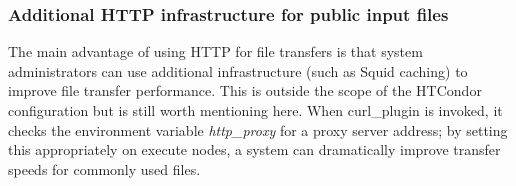 \subsubsection{\label{sec:HTTP-Public-Files-Infrastructure}Additional
HTTP infrastructure for public input files}

The main advantage of using HTTP for file transfers is that system
administrators can use additional infrastructure (such as Squid caching) to
improve file transfer performance. This is outside the scope of the HTCondor 
configuration but is still worth mentioning here. When curl\_plugin is
invoked, it checks the environment variable \emph{http\_proxy} for a proxy 
server address; by setting this appropriately on execute nodes, a system 
can dramatically improve transfer speeds for commonly used files.

